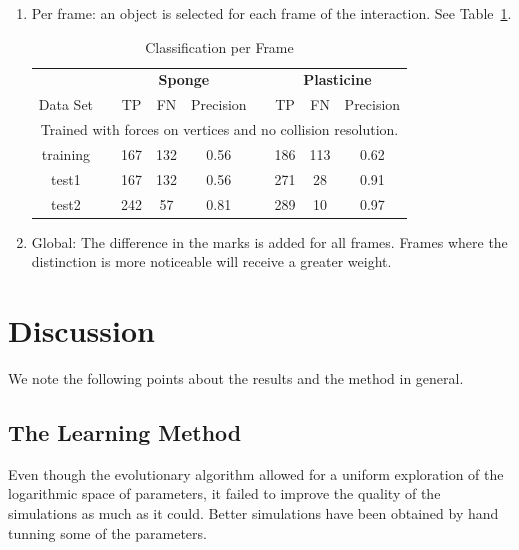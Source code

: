 \documentclass[journal]{IEEEtran}
\newcommand{\tref}[1]{Table~\ref{#1}}
\newcounter{algorithm}
\begin{document}
\begin{enumerate}
 \item Per frame: an object is selected for each frame of the interaction. See \tref{tab:classperframe}.

\begin{table}[!t]
\renewcommand{\arraystretch}{1.3}
\caption{Classification per Frame}
\label{tab:classperframe}
\centering
\begin{tabular}{ccccccccc}
\hline
 & & \multicolumn{3}{c}{\bfseries Sponge} & & \multicolumn{3}{c}{\bfseries Plasticine} \\
Data Set & & TP & FN & Precision & & TP & FN & Precision\\
\hline\hline
 \multicolumn{9}{c}{Trained with forces on vertices and no collision resolution.} \\
\hline
   training & & 167 & 132 & 0.56 & & 186 & 113 & 0.62 \\
   test1 & & 167 & 132 & 0.56 & & 271 & 28 & 0.91 \\
   test2 & & 242 & 57 & 0.81 & & 289 & 10 & 0.97 \\ 
\hline
\end{tabular}
\end{table}

 \item Global: The difference in the marks is added for all frames.  Frames where the distinction is more noticeable will receive a greater weight.
\end{enumerate}



\section{Discussion}
\label{sec:discussion}
We note the following points about the results and the method in general.
\subsection{The Learning Method}
Even though the evolutionary algorithm allowed for a uniform exploration of the logarithmic space of parameters, it failed to improve the quality of the simulations as much as it could.  Better simulations have been obtained by hand tunning some of the parameters.  %
\end{document}
